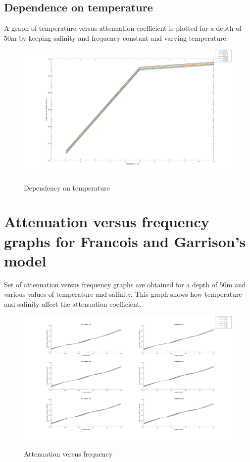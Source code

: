 \subsection{Dependence on temperature} \label{Dependence on temperature} 
\noindent A graph of temperature versus attenuation coefficient is plotted for a depth of 50m by keeping salinity and frequency constant and varying temperature.
\begin{figure}[H]
\centering
{\includegraphics[scale=0.15]{ucp2_4.png}}
\caption{Dependency on temperature}
\end{figure}

\section{Attenuation versus frequency graphs for Francois and Garrison's model} \label{Attenuation versus frequency graphs for Francois and Garrison's model} 
\noindent  Set of attenuation versus frequency graphs are obtained for a depth of 50m and various values of temperature and salinity. This graph shows how temperature and salinity affect the attenuation coefficient.

\begin{figure}[H]
\centering
{\includegraphics[scale=0.15]{ucp2_5.png}}
\caption{Attenuation versus frequency}
\end{figure}



